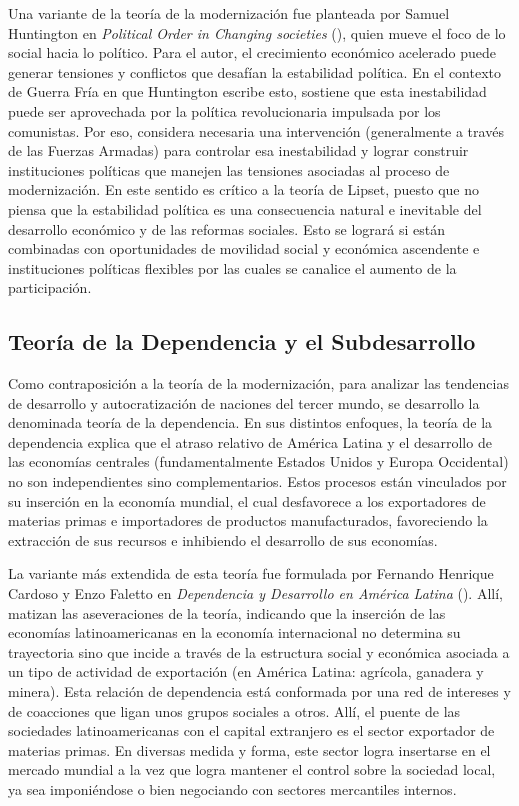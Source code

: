 \documentclass{article}
\begin{document}
Una variante de la teoría de la modernización fue planteada por Samuel Huntington 
en \textit{Political Order in Changing societies} (\citeyear{huntington68political}),
quien mueve el foco de lo social hacia lo político. Para el autor, el crecimiento 
económico acelerado puede generar tensiones y conflictos que desafían la estabilidad
política. En el contexto de Guerra Fría en que Huntington escribe esto, sostiene que
esta inestabilidad puede ser aprovechada por la política revolucionaria impulsada por
los comunistas. Por eso, considera necesaria una intervención (generalmente a través
de las Fuerzas Armadas) para controlar esa inestabilidad y lograr construir instituciones
políticas que manejen las tensiones asociadas al proceso de modernización. En este 
sentido es crítico a la teoría de Lipset, puesto que no piensa que la estabilidad política
es una consecuencia natural e inevitable del desarrollo económico y de las reformas 
sociales. Esto se logrará si están combinadas con oportunidades de movilidad social y
económica ascendente e instituciones políticas flexibles por las cuales se canalice
el aumento de la participación.

\subsection{Teoría de la Dependencia y el Subdesarrollo}

Como contraposición a la teoría de la modernización, para analizar las tendencias de
desarrollo y autocratización de naciones del tercer mundo, se desarrollo la denominada
teoría de la dependencia. En sus distintos enfoques, la teoría de la dependencia explica
que el atraso relativo de América Latina y el desarrollo de las economías centrales
(fundamentalmente Estados Unidos y Europa Occidental) no son independientes sino 
complementarios. Estos procesos están vinculados por su inserción en la economía mundial,
el cual desfavorece a los exportadores de materias primas e importadores de productos
manufacturados, favoreciendo la extracción de sus recursos e inhibiendo el desarrollo
de sus economías.

La variante más extendida de esta teoría fue formulada por Fernando Henrique Cardoso
y Enzo Faletto en \textit{Dependencia y Desarrollo en América Latina} 
(\citeyear{cardoso1979dependencia}). Allí, matizan las aseveraciones de la teoría, 
indicando que la inserción de las economías latinoamericanas en la economía internacional
no determina su trayectoria sino que incide a través de la estructura social y económica
asociada a un tipo de actividad de exportación (en América Latina: agrícola, ganadera y
minera). Esta relación de dependencia está conformada por una red de intereses y de 
coacciones que ligan unos grupos sociales a otros. Allí, el puente de las sociedades 
latinoamericanas con el capital extranjero es el sector exportador de materias primas. 
En diversas medida y forma, este sector logra insertarse en el mercado mundial a la vez 
que logra mantener el control sobre la sociedad local, ya sea imponiéndose o bien 
negociando con sectores mercantiles internos.
\end{document}

